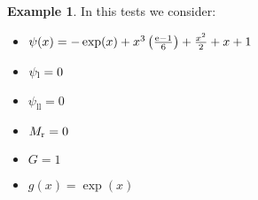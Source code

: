 \documentclass[11pt,a4paper]{article}
\theoremstyle{plain}
\theoremstyle{definition}
\newtheorem{exmp}[thm]{Example} %
\begin{document}
\begin{exmp}
\label{Example:PRO:bending:01_23_glob2v2}
In this tests we consider:
\begin{itemize}
\item $\psi(x)=-\exp(x)+x^3\left(\frac{\text e-1}{6}\right)+\frac{x^2}{2}+x+1$
\item $\psi_\text l=0$
\item $\psi_\text{ll}=0$
\item $M_\text r=0$
\item $G=1$
\item $g(x)=\exp(x)$
\end{itemize}
\end{exmp}
%
%
%
\pagebreak
\end{document}
